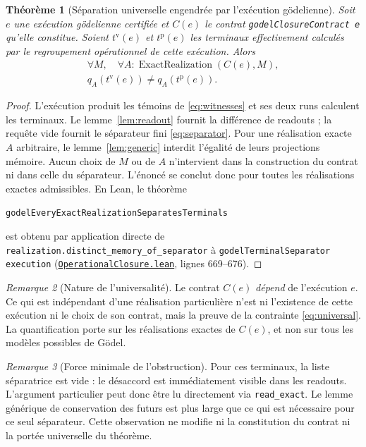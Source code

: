 \documentclass[11pt,a4paper]{article}
\newcommand{\ExactRealization}{\operatorname{ExactRealization}}
\newcommand{\code}[1]{\nolinkurl{#1}}
\newcommand{\SourceAt}[3]{\href{https://github.com/JohnDoe-collab-stack/relational-perimeter/blob/1e5aeda745559d62a3819bb3213da7fce3c31ad1/#1\#L#2}{\nolinkurl{#3}}}
\newtheorem{theoreme}{Théorème}[section]
\theoremstyle{remark}
\newtheorem{remarque}[theoreme]{Remarque}
\begin{document}
\begin{theoreme}[Séparation universelle engendrée par l'exécution gödelienne]
\label{thm:universal}
Soit $e$ une exécution gödelienne certifiée et $C(e)$ le contrat
\code{godelClosureContract e} qu'elle constitue. Soient
$t^{\mathrm v}(e)$ et $t^{\mathrm p}(e)$ les terminaux effectivement
calculés par le regroupement opérationnel de cette exécution. Alors
\begin{equation}\label{eq:universal}
\boxed{\begin{gathered}
\forall M,\quad \forall A:\ExactRealization(C(e),M),\\
q_A(t^{\mathrm v}(e))\neq q_A(t^{\mathrm p}(e)).
\end{gathered}}
\end{equation}
\end{theoreme}
\begin{proof}
L'exécution produit les témoins de \eqref{eq:witnesses} et ses deux runs
calculent les terminaux. Le lemme~\ref{lem:readout} fournit la différence
de readouts ; la requête vide fournit le séparateur fini
\eqref{eq:separator}. Pour une réalisation exacte $A$ arbitraire, le
lemme~\ref{lem:generic} interdit l'égalité de leurs projections mémoire.
Aucun choix de $M$ ou de $A$ n'intervient dans la construction du contrat
ni dans celle du séparateur. L'énoncé se conclut donc pour toutes les
réalisations exactes admissibles. En Lean, le théorème
\begin{center}
\code{godelEveryExactRealizationSeparatesTerminals}
\end{center}
est obtenu par
application directe de
\code{realization.distinct\_memory\_of\_separator}
à \code{godelTerminalSeparator execution}
(\SourceAt{RelationalPerimeter/Constitution/Godel/OperationalClosure.lean}{669-L676}{OperationalClosure.lean},
lignes 669--676).
\end{proof}

\begin{remarque}[Nature de l'universalité]
Le contrat $C(e)$ \emph{dépend} de l'exécution $e$. Ce qui est indépendant
d'une réalisation particulière n'est ni l'existence de cette exécution
ni le choix de son contrat, mais la preuve de la contrainte
\eqref{eq:universal}. La quantification porte sur les réalisations exactes
de $C(e)$, et non sur tous les modèles possibles de Gödel.
\end{remarque}

\begin{remarque}[Force minimale de l'obstruction]
Pour ces terminaux, la liste séparatrice est vide : le désaccord est
immédiatement visible dans les readouts. L'argument particulier peut donc
être lu directement via \code{read\_exact}. Le lemme générique de
conservation des futurs est plus large que ce qui est nécessaire pour
ce seul séparateur. Cette observation ne modifie ni la constitution du
contrat ni la portée universelle du théorème.
\end{remarque}
\end{document}
